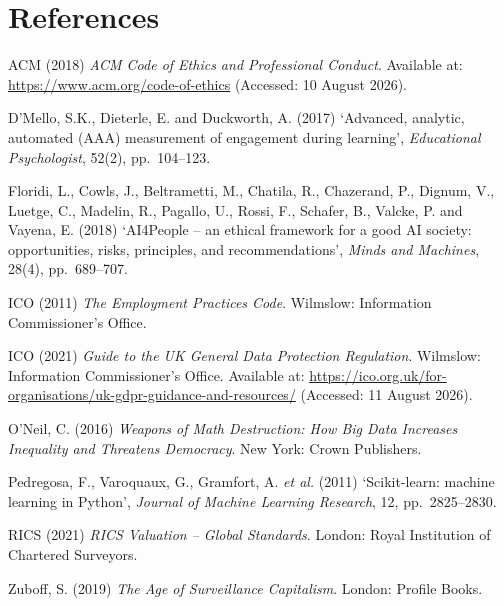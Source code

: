 \documentclass[11pt,a4paper]{article}
\begin{document}
\section*{References}

\begin{description}
\item ACM (2018) \emph{ACM Code of Ethics and Professional Conduct}. Available at:
\url{https://www.acm.org/code-of-ethics} (Accessed: 10 August 2026).
\item D'Mello, S.K., Dieterle, E. and Duckworth, A. (2017) `Advanced, analytic, automated (AAA)
measurement of engagement during learning', \emph{Educational Psychologist}, 52(2), pp.~104--123.

\item Floridi, L., Cowls, J., Beltrametti, M., Chatila, R., Chazerand, P., Dignum, V., Luetge,
C., Madelin, R., Pagallo, U., Rossi, F., Schafer, B., Valcke, P. and Vayena, E. (2018)
`AI4People -- an ethical framework for a good AI society: opportunities, risks, principles, and
recommendations', \emph{Minds and Machines}, 28(4), pp.~689--707.
\item ICO (2011) \emph{The Employment Practices Code}. Wilmslow: Information Commissioner's
Office.
\item ICO (2021) \emph{Guide to the UK General Data Protection Regulation}. Wilmslow:
Information Commissioner's Office. Available at:
\url{https://ico.org.uk/for-organisations/uk-gdpr-guidance-and-resources/}
(Accessed: 11 August 2026).
\item O'Neil, C. (2016) \emph{Weapons of Math Destruction: How Big Data Increases Inequality and
Threatens Democracy}. New York: Crown Publishers.
\item Pedregosa, F., Varoquaux, G., Gramfort, A. \emph{et al.} (2011) `Scikit-learn: machine
learning in Python', \emph{Journal of Machine Learning Research}, 12, pp.~2825--2830.
\item RICS (2021) \emph{RICS Valuation -- Global Standards}. London: Royal Institution of
Chartered Surveyors.
\item Zuboff, S. (2019) \emph{The Age of Surveillance Capitalism}. London: Profile Books.
\end{description}
\end{document}
